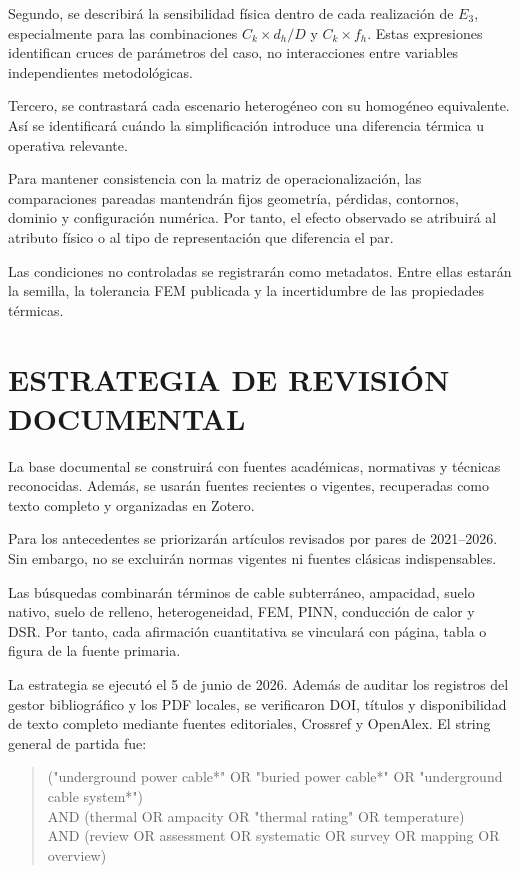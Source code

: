 \documentclass[11pt,a4paper,oneside]{report}
\newcommand{\tesisbodyfont}{\fontsize{11}{13.6}\selectfont}
\begin{document}
\begin{singlespace}
\begin{landscape}
Segundo, se describirá la sensibilidad física dentro de cada realización de $E_3$, especialmente para las combinaciones $C_k\times d_h/D$ y $C_k\times f_h$. Estas expresiones identifican cruces de parámetros del caso, no interacciones entre variables independientes metodológicas.

Tercero, se contrastará cada escenario heterogéneo con su homogéneo equivalente. Así se identificará cuándo la simplificación introduce una diferencia térmica u operativa relevante.

Para mantener consistencia con la matriz de operacionalización, las comparaciones pareadas mantendrán fijos geometría, pérdidas, contornos, dominio y configuración numérica. Por tanto, el efecto observado se atribuirá al atributo físico o al tipo de representación que diferencia el par.

Las condiciones no controladas se registrarán como metadatos. Entre ellas estarán la semilla, la tolerancia FEM publicada y la incertidumbre de las propiedades térmicas.

\end{landscape}
\clearpage
\tesisbodyfont

\section{ESTRATEGIA DE REVISIÓN DOCUMENTAL}
\thispagestyle{empty}

La base documental se construirá con fuentes académicas, normativas y técnicas reconocidas. Además, se usarán fuentes recientes o vigentes, recuperadas como texto completo y organizadas en Zotero.

Para los antecedentes se priorizarán artículos revisados por pares de 2021--2026. Sin embargo, no se excluirán normas vigentes ni fuentes clásicas indispensables.

Las búsquedas combinarán términos de cable subterráneo, ampacidad, suelo nativo, suelo de relleno, heterogeneidad, FEM, PINN, conducción de calor y DSR. Por tanto, cada afirmación cuantitativa se vinculará con página, tabla o figura de la fuente primaria.

La estrategia se ejecutó el 5 de junio de 2026. Además de auditar los registros del gestor bibliográfico y los PDF locales, se verificaron DOI, títulos y disponibilidad de texto completo mediante fuentes editoriales, Crossref y OpenAlex. El string general de partida fue:

\begin{quote}\scriptsize\ttfamily\RaggedRight
("underground power cable*" OR "buried power cable*" OR "underground cable system*")\\
AND (thermal OR ampacity OR "thermal rating" OR temperature)\\
AND (review OR assessment OR systematic OR survey OR mapping OR overview)
\end{quote}


\end{singlespace}
\end{document}
